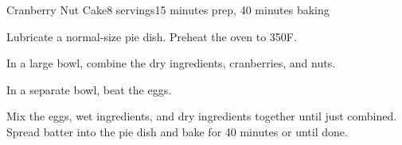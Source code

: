 \documentclass[../Cookbook.tex]{subfiles}
\begin{document}
\begin{recipe}{Cranberry Nut Cake}{8 servings}{15 minutes prep, 40 minutes baking}

Lubricate a normal-size pie dish. Preheat the oven to 350\0F.

In a large bowl, combine the dry ingredients, cranberries, and nuts.

In a separate bowl, beat the eggs.

Mix the eggs, wet ingredients, and dry ingredients together until just combined. Spread batter into the pie dish and bake for 40 minutes or until done.

\end{recipe}
\end{document}
